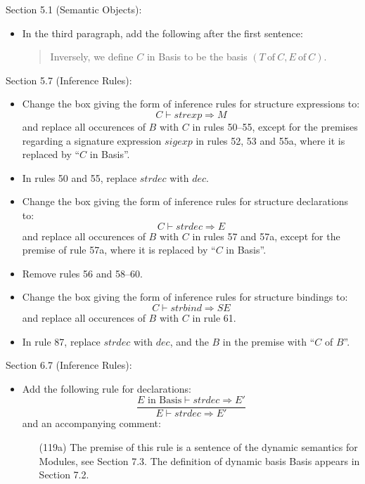 \documentclass[twoside,titlepage]{article}
\begin{document}
\begin{appendix}
Section 5.1 (Semantic Objects):
\begin{itemize}
\item In the third paragraph, add the following after the first sentence:
  \begin{quote}
  Inversely, we define $C$ in Basis to be the basis $(T~\mbox{of}~C, E~\mbox{of}~C)$.
  \end{quote}
\end{itemize}

Section 5.7 (Inference Rules):
\begin{itemize}
\item Change the box giving the form of inference rules for structure expressions to:
  $$
  \boxed{C \vdash \mathit{strexp} \Rightarrow M}
  $$
  and replace all occurences of $B$ with $C$ in rules 50--55, except for the premises regarding a signature expression $\mathit{sigexp}$ in rules 52, 53 and 55a, where it is replaced by ``$C$ in Basis''.

\item In rules 50 and 55, replace $\mathit{strdec}$ with $\mathit{dec}$.

\item Change the box giving the form of inference rules for structure declarations to:
  $$
  \boxed{C \vdash \mathit{strdec} \Rightarrow E}
  $$
  and replace all occurences of $B$ with $C$ in rules 57 and 57a, except for the premise of rule 57a, where it is replaced by ``$C$ in Basis''.

\item Remove rules 56 and 58--60.

\item Change the box giving the form of inference rules for structure bindings to:
  $$
  \boxed{C \vdash \mathit{strbind} \Rightarrow \mathit{SE}}
  $$
  and replace all occurences of $B$ with $C$ in rule 61.

\item In rule 87, replace $\mathit{strdec}$ with $\mathit{dec}$, and the $B$ in the premise with ``$C$ of $B$''.
\end{itemize}

Section 6.7 (Inference Rules):
\begin{itemize}
\item Add the following rule for declarations:
  \begin{equation}
  \tag{119a}
  \frac{
  \mbox{$E$ in Basis} \vdash \mathit{strdec} \Rightarrow E'
  }{
  E \vdash \mathit{strdec} \Rightarrow E'
  }
  \end{equation}
  and an accompanying comment:
  \begin{enumerate}
  \item[(119a)] The premise of this rule is a sentence of the dynamic semantics for Modules, see Section 7.3. The definition of dynamic basis Basis appears in Section 7.2.
  \end{enumerate}
\end{itemize}


\end{appendix}
\end{document}
